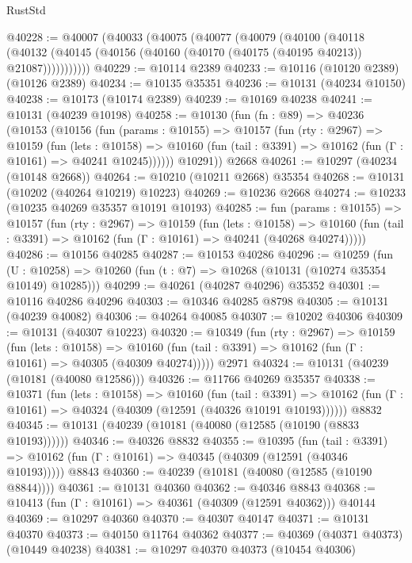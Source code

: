\begin{lexlean}{RustStd}
\begin{coremodule}
@40228 := @40007
    (@40033
      (@40075
        (@40077
          (@40079
            (@40100
              (@40118
                (@40132 (@40145 (@40156 (@40160 (@40170 (@40175 (@40195 @40213)) @21087)))))))))))
@40229 := @10114 @2389
@40233 := @10116 (@10120 @2389) (@10126 @2389)
@40234 := @10135 @35351
@40236 := @10131 (@40234 @10150)
@40238 := @10173 (@10174 @2389)
@40239 := @10169 @40238
@40241 := @10131 (@40239 @10198)
@40258 := @10130
    (fun (fn : @89) =>
    @40236
      (@10153
        (@10156
          (fun (params : @10155) =>
          @10157
            (fun (rty : @2967) =>
            @10159
              (fun (lets : @10158) =>
              @10160 (fun (tail : @3391) => @10162 (fun (Γ : @10161) => @40241 @10245))))))
        @10291))
    @2668
@40261 := @10297 (@40234 (@10148 @2668))
@40264 := @10210 (@10211 @2668) @35354
@40268 := @10131 (@10202 (@40264 @10219) @10223)
@40269 := @10236 @2668
@40274 := @10233 (@10235 @40269 @35357 @10191 @10193)
@40285 := fun (params : @10155) =>
  @10157
    (fun (rty : @2967) =>
    @10159
      (fun (lets : @10158) =>
      @10160 (fun (tail : @3391) => @10162 (fun (Γ : @10161) => @40241 (@40268 @40274)))))
@40286 := @10156 @40285
@40287 := @10153 @40286
@40296 := @10259
    (fun (U : @10258) => @10260 (fun (t : @7) => @10268 (@10131 (@10274 @35354 @10149) @10285)))
@40299 := @40261 (@40287 @40296) @35352
@40301 := @10116 @40286 @40296
@40303 := @10346 @40285 @8798
@40305 := @10131 (@40239 @40082)
@40306 := @40264 @40085
@40307 := @10202 @40306
@40309 := @10131 (@40307 @10223)
@40320 := @10349
    (fun (rty : @2967) =>
    @10159
      (fun (lets : @10158) =>
      @10160 (fun (tail : @3391) => @10162 (fun (Γ : @10161) => @40305 (@40309 @40274)))))
    @2971
@40324 := @10131 (@40239 (@10181 (@40080 @12586)))
@40326 := @11766 @40269 @35357
@40338 := @10371
    (fun (lets : @10158) =>
    @10160
      (fun (tail : @3391) =>
      @10162 (fun (Γ : @10161) => @40324 (@40309 (@12591 (@40326 @10191 @10193))))))
    @8832
@40345 := @10131 (@40239 (@10181 (@40080 (@12585 (@10190 (@8833 @10193))))))
@40346 := @40326 @8832
@40355 := @10395
    (fun (tail : @3391) => @10162 (fun (Γ : @10161) => @40345 (@40309 (@12591 (@40346 @10193)))))
    @8843
@40360 := @40239 (@10181 (@40080 (@12585 (@10190 @8844))))
@40361 := @10131 @40360
@40362 := @40346 @8843
@40368 := @10413 (fun (Γ : @10161) => @40361 (@40309 (@12591 @40362))) @40144
@40369 := @10297 @40360
@40370 := @40307 @40147
@40371 := @10131 @40370
@40373 := @40150 @11764 @40362
@40377 := @40369 (@40371 @40373) (@10449 @40238)
@40381 := @10297 @40370 @40373 (@10454 @40306)

\end{coremodule}
\end{lexlean}
